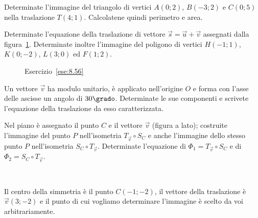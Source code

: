 \begin{esercizio}
	\label{ese:8.55} %
	Determinate l'immagine del triangolo di vertici $A(0;2)$, $B(-3;2)$ e 
	$C(0;5)$ nella traslazione $T(4;1)$. Calcolatene quindi perimetro e 
	area.
\end{esercizio}

\begin{esercizio}
	\label{ese:8.56} %
	Determinate l'equazione della traslazione di vettore 
	$\vec{s}=\vec{u}+\vec{v}$ assegnati dalla figura~\ref{fig:ese8.56}. 
	Determinate inoltre l'immagine del poligono di vertici $H(-1;1)$, 
	$K(0;-2)$, $L(3;0)$ ed $F(1;2)$.
\end{esercizio}

\begin{inaccessibleblock}
	\begin{figure}[!htb]
		\centering
		\caption{Esercizio~\ref{ese:8.56}}\label{fig:ese8.56}
	\end{figure}
\end{inaccessibleblock}\vspace{8pt}

\begin{esercizio}
	\label{ese:8.57} %
	Un vettore $\vec{v}$ ha modulo unitario, è applicato nell'origine $O$ 
	e forma con l'asse delle ascisse un angolo di $30\grado$. Determinate 
	le sue componenti e scrivete l'equazione della traslazione da esso 
	caratterizzata.
\end{esercizio}

\noindent\begin{minipage}{0.7\textwidth}\parindent15pt

\begin{esercizio}
	\label{ese:8.63} %
	Nel piano è assegnato il punto $C$ e il vettore $\vec{v}$ (figura a 
	lato); costruite l'immagine del punto $P$ nell'isometria $T_{\vec{v}} 
	\circ S_{C}$ e anche l'immagine dello stesso punto $P$ nell'isometria 
	$S_{C} \circ T_{\vec{v}}$. Determinate l'equazione di $\Phi_1 = 
	T_{\vec{v}} \circ S_{C}$ e di $\Phi_2 = S_{C} \circ T_{\vec{v}}$.
\end{esercizio}
\end{minipage}\hfil
\begin{minipage}{0.25\textwidth}
	\centering~~
\end{minipage}\vspace{8pt}

\begin{esercizio}
	\label{ese:8.64} %
	Il centro della simmetria è il punto $C(-1;-2)$, il vettore della 
	traslazione è $\vec{v}(3;-2)$ e il punto di cui vogliamo determinare 
	l'immagine è scelto da voi arbitrariamente. 
\end{esercizio}

